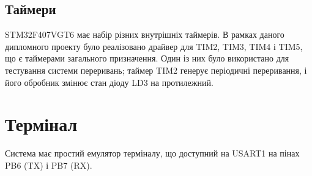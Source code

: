 \documentclass[oneside,14pt,a4paper,final]{myextreport}
\begin{document}
\subsection{Таймери}

STM32F407VGT6 має набір різних внутрішніх таймерів. В рамках даного дипломного проекту було реалізовано драйвер для TIM2, TIM3, TIM4 і TIM5, що є таймерами загального призначення. Один із них було використано для тестування системи переривань; таймер TIM2 генерує періодичні переривання, і його обробник змінює стан діоду LD3 на протилежний.

\section{Термінал}

Система має простий емулятор терміналу, що доступний на USART1 на пінах PB6 (TX) і PB7 (RX).
\end{document}
